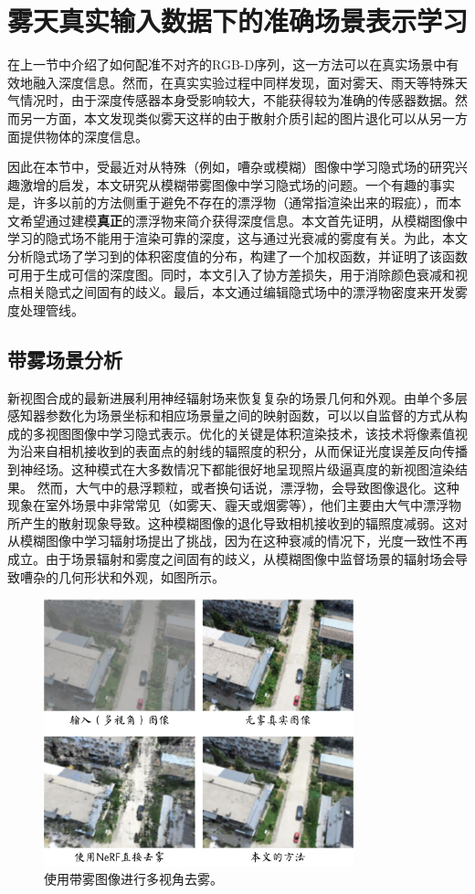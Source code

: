 \newpage
\section{雾天真实输入数据下的准确场景表示学习}
在上一节中介绍了如何配准不对齐的RGB-D序列，这一方法可以在真实场景中有效地融入深度信息。然而，在真实实验过程中同样发现，面对雾天、雨天等特殊天气情况时，由于深度传感器本身受影响较大，不能获得较为准确的传感器数据。然而另一方面，本文发现类似雾天这样的由于散射介质引起的图片退化可以从另一方面提供物体的深度信息。

因此在本节中，受最近对从特殊（例如，嘈杂或模糊）图像中学习隐式场的研究兴趣激增的启发，本文研究从模糊带雾图像中学习隐式场的问题。一个有趣的事实是，许多以前的方法侧重于避免不存在的漂浮物（通常指渲染出来的瑕疵），而本文希望通过建模\textbf{真正}的漂浮物来简介获得深度信息。本文首先证明，从模糊图像中学习的隐式场不能用于渲染可靠的深度，这与通过光衰减的雾度有关。为此，本文分析隐式场了学习到的体积密度值的分布，构建了一个加权函数，并证明了该函数可用于生成可信的深度图。同时，本文引入了协方差损失，用于消除颜色衰减和视点相关隐式之间固有的歧义。最后，本文通过编辑隐式场中的漂浮物密度来开发雾度处理管线。

\subsection{带雾场景分析}
新视图合成的最新进展利用神经辐射场来恢复复杂的场景几何和外观。由单个多层感知器参数化为场景坐标和相应场景量之间的映射函数，可以以自监督的方式从构成的多视图图像中学习隐式表示。优化的关键是体积渲染技术，该技术将像素值视为沿来自相机接收到的表面点的射线的辐照度的积分，从而保证光度误差反向传播到神经场。这种模式在大多数情况下都能很好地呈现照片级逼真度的新视图渲染结果。 
然而，大气中的悬浮颗粒，或者换句话说，漂浮物，会导致图像退化。这种现象在室外场景中非常常见（如雾天、霾天或烟雾等），他们主要由大气中漂浮物所产生的散射现象导致。这种模糊图像的退化导致相机接收到的辐照度减弱。这对从模糊图像中学习辐射场提出了挑战，因为在这种衰减的情况下，光度一致性不再成立。由于场景辐射和雾度之间固有的歧义，从模糊图像中监督场景的辐射场会导致嘈杂的几何形状和外观，如图所示。

\begin{figure}[ht]
    \centering
    \includegraphics[width=0.8\textwidth]{undergraduate-thesis/images/dehazing-nerf/teaser.pdf}
    \caption{使用带雾图像进行多视角去雾。}
    \label{fig:dehazing-nerf teaser}
\end{figure}

